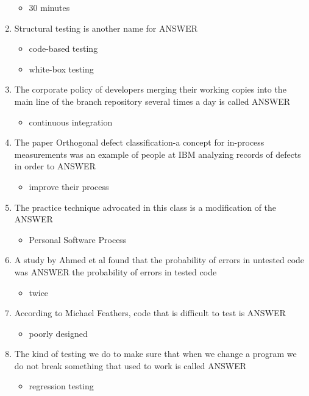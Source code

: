 \documentclass{exam}
\begin{document}
\begin{enumerate}
\begin{itemize}
\item 30 minutes
\end{itemize}
\item Structural testing is another name for ANSWER
\begin{itemize}
\item code-based testing
\item white-box testing
\end{itemize}
\item The corporate policy of developers merging their working copies into the main line of the branch repository several times a day is called ANSWER
\begin{itemize}
\item continuous integration
\end{itemize}
\item The paper Orthogonal defect classification-a concept for in-process measurements was an example of people at IBM analyzing records of defects in order to ANSWER
\begin{itemize}
\item improve their process
\end{itemize}
\item The practice technique advocated in this class is a modification of the ANSWER
\begin{itemize}
\item Personal Software Process
\end{itemize}
\item A study by Ahmed et al found that the probability of errors in untested code was ANSWER the probability of errors in tested code
\begin{itemize}
\item twice
\end{itemize}
\item According to Michael Feathers, code that is difficult to test is ANSWER
\begin{itemize}
\item poorly designed
\end{itemize}
\item The kind of testing we do to make sure that when we change a program we do not break something that used to work is called ANSWER
\begin{itemize}
\item regression testing
\end{itemize}
\end{enumerate}
\end{document}
